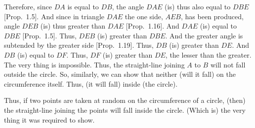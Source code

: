 \begin{Parallel}{}{}
{Therefore, since $DA$ is equal to $DB$, the angle $DAE$ (is) thus also equal to
$DBE$ [Prop.~1.5]. And since in triangle $DAE$ the one side, $AEB$, has been
produced, angle $DEB$ (is) thus greater than $DAE$ [Prop.~1.16]. And
$DAE$ (is) equal to $DBE$ [Prop.~1.5]. Thus, $DEB$ (is) greater than $DBE$.
And the greater angle is subtended by the greater side [Prop.~1.19].
Thus, $DB$ (is) greater than $DE$. And $DB$ (is) equal to $DF$. Thus,
$DF$ (is) greater than $DE$, the lesser than the greater. The very thing is impossible.
Thus, the straight-line joining $A$ to $B$ will not fall outside the
circle. So, similarly, we can show that neither (will it fall) on the
circumference itself. Thus, (it will fall) inside (the circle).

\epsfysize=2.2in
\centerline{}

Thus, if two points are taken at random on the circumference of a circle, (then)
the straight-line joining the points will fall inside the circle. (Which is) the
very thing it was required to show.}
\end{Parallel}

